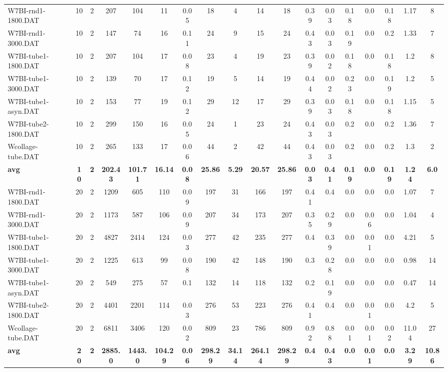 \begin{sidewaystable}[h]
{\begin{tabular}{lccccccccccccccccc}
W7BI-rnd1-1800.DAT & 10 & 2 & 207 & 104 & 11 & 0.05 & 18 & 4 & 14 & 18 & 0.39 & 0.03 & 0.18 & 0.0 & 0.18 & 1.17 & 8\\
W7BI-rnd1-3000.DAT & 10 & 2 & 147 & 74 & 16 & 0.11 & 24 & 9 & 15 & 24 & 0.43 & 0.03 & 0.19 & 0.0 & 0.2 & 1.33 & 7\\
W7BI-tube1-1800.DAT & 10 & 2 & 207 & 104 & 17 & 0.08 & 23 & 4 & 19 & 23 & 0.39 & 0.02 & 0.18 & 0.0 & 0.18 & 1.2 & 8\\
W7BI-tube1-3000.DAT & 10 & 2 & 139 & 70 & 17 & 0.12 & 19 & 5 & 14 & 19 & 0.44 & 0.02 & 0.23 & 0.0 & 0.19 & 1.2 & 5\\
W7BI-tube1-asyn.DAT & 10 & 2 & 153 & 77 & 19 & 0.12 & 29 & 12 & 17 & 29 & 0.39 & 0.03 & 0.18 & 0.0 & 0.18 & 1.15 & 5\\
W7BI-tube2-1800.DAT & 10 & 2 & 299 & 150 & 16 & 0.05 & 24 & 1 & 23 & 24 & 0.43 & 0.03 & 0.2 & 0.0 & 0.2 & 1.36 & 7\\
Wcollage-tube.DAT & 10 & 2 & 265 & 133 & 17 & 0.06 & 44 & 2 & 42 & 44 & 0.43 & 0.03 & 0.2 & 0.0 & 0.2 & 1.3 & 2\\
\cline{1-18} \textbf{avg} & \textbf{10} & \textbf{2} & \textbf{202.43} & \textbf{101.71} & \textbf{16.14} & \textbf{0.08} & \textbf{25.86} & \textbf{5.29} & \textbf{20.57} & \textbf{25.86} & \textbf{0.03} & \textbf{0.41} & \textbf{0.19} & \textbf{0.0} & \textbf{0.19} & \textbf{1.24} & \textbf{6.0} \\ \cline{1-18}
W7BI-rnd1-1800.DAT & 20 & 2 & 1209 & 605 & 110 & 0.09 & 197 & 31 & 166 & 197 & 0.41 & 0.4 & 0.0 & 0.0 & 0.0 & 1.07 & 7\\
W7BI-rnd1-3000.DAT & 20 & 2 & 1173 & 587 & 106 & 0.09 & 207 & 34 & 173 & 207 & 0.35 & 0.29 & 0.0 & 0.06 & 0.0 & 1.04 & 4\\
W7BI-tube1-1800.DAT & 20 & 2 & 4827 & 2414 & 124 & 0.03 & 277 & 42 & 235 & 277 & 0.4 & 0.39 & 0.0 & 0.01 & 0.0 & 4.21 & 5\\
W7BI-tube1-3000.DAT & 20 & 2 & 1225 & 613 & 99 & 0.08 & 190 & 42 & 148 & 190 & 0.3 & 0.28 & 0.0 & 0.0 & 0.0 & 0.98 & 14\\
W7BI-tube1-asyn.DAT & 20 & 2 & 549 & 275 & 57 & 0.1 & 132 & 14 & 118 & 132 & 0.2 & 0.19 & 0.0 & 0.0 & 0.0 & 0.47 & 14\\
W7BI-tube2-1800.DAT & 20 & 2 & 4401 & 2201 & 114 & 0.03 & 276 & 53 & 223 & 276 & 0.41 & 0.4 & 0.0 & 0.01 & 0.0 & 4.2 & 5\\
Wcollage-tube.DAT & 20 & 2 & 6811 & 3406 & 120 & 0.02 & 809 & 23 & 786 & 809 & 0.92 & 0.88 & 0.01 & 0.01 & 0.02 & 11.04 & 27\\
\cline{1-18} \textbf{avg} & \textbf{20} & \textbf{2} & \textbf{2885.0} & \textbf{1443.0} & \textbf{104.29} & \textbf{0.06} & \textbf{298.29} & \textbf{34.14} & \textbf{264.14} & \textbf{298.29} & \textbf{0.4} & \textbf{0.43} & \textbf{0.0} & \textbf{0.01} & \textbf{0.0} & \textbf{3.29} & \textbf{10.86} \\ \cline{1-18}

\end{tabular}}
\end{sidewaystable}

